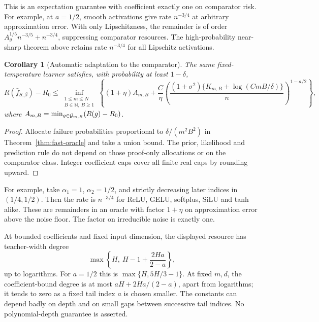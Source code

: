 \documentclass[11pt]{article}
\newtheorem{corollary}[theorem]{Corollary}\newtheorem{proposition}[theorem]{Proposition}
\theoremstyle{remark}\newtheorem{remark}[theorem]{Remark}
\begin{document}
This is an expectation guarantee with coefficient exactly one on comparator risk. For example, at $a=1/2$, smooth activations give rate $n^{-3/4}$ at arbitrary approximation error. With only Lipschitzness, the remainder is of order $A_g^{1/5}n^{-3/5}+n^{-3/4}$, suppressing comparator resources. The high-probability near-sharp theorem above retains rate $n^{-3/4}$ for all Lipschitz activations.

\begin{corollary}[Automatic adaptation to the comparator]\label{cor:structural-oracle}
The same fixed-temperature learner satisfies, with probability at least $1-\delta$,
\[
 R(\bar f_{S,\beta})-R_0
 \le\inf_{\substack{1\le m\le N\\B\in\mathbb N,\ B\ge1}}
 \left\{(1+\eta)A_{m,B}
 +\frac C\eta\left(
 \frac{(1+\sigma^2)\{K_{m,B}+\log(CmB/\delta)\}}n
 \right)^{1-a/2}\right\},
\]
where $A_{m,B}=\min_{g\in\mathcal G_{m,B}}(R(g)-R_0)$.
\end{corollary}
\begin{proof}
Allocate failure probabilities proportional to $\delta/(m^2B^2)$ in Theorem~\ref{thm:fast-oracle} and take a union bound. The prior, likelihood and prediction rule do not depend on those proof-only allocations or on the comparator class. Integer coefficient caps cover all finite real caps by rounding upward.
\end{proof}

For example, take $\alpha_1=1$, $\alpha_2=1/2$, and strictly decreasing later indices in $(1/4,1/2)$. Then the rate is $n^{-3/4}$ for ReLU, GELU, softplus, SiLU and tanh alike. These are remainders in an oracle with factor $1+\eta$ on approximation error above the noise floor. The factor on irreducible noise is exactly one.

At bounded coefficients and fixed input dimension, the displayed resource has teacher-width degree
\begin{equation}
 \max\left\{H,\ H-1+\frac{2Ha}{2-a}\right\},
 \label{eq:width-degree}
\end{equation}
up to logarithms. For $a=1/2$ this is $\max\{H,5H/3-1\}$. At fixed $m,d$, the coefficient-bound degree is at most $aH+2Ha/(2-a)$, apart from logarithms; it tends to zero as a fixed tail index $a$ is chosen smaller. The constants can depend badly on depth and on small gaps between successive tail indices. No polynomial-depth guarantee is asserted.
\end{document}
